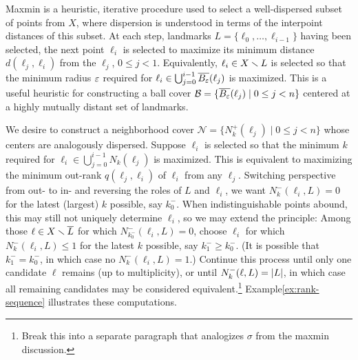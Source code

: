 \documentclass[
]{article}
\begin{document}
Maxmin is a heuristic, iterative procedure used to select a
well-dispersed subset of points from \(X\), where dispersion is
understood in terms of the interpoint distances of this subset. At each
step, landmarks \(L = \{\ell_0, \ldots, \ell_{i-1}\}\) having been
selected, the next point \(\ell_i\) is selected to maximize its minimum
distance \(d(\ell_j,\ell_i)\) from the \(\ell_j\), \(0 \leq j < 1\).
Equivalently, \(\ell_i \in X \smallsetminus L\) is selected so that the minimum
radius \(\varepsilon\) required for
\(\ell_i \in \bigcup_{j=0}^{i-1}{\overline{B_\varepsilon}(\ell_j)}\) is maximized.
This is a useful heuristic for constructing a ball cover
\(\mathcal{B} = \{\overline{B_\varepsilon}(\ell_j) \mid 0 \leq j < n\}\) centered at
a highly mutually distant set of landmarks.

We desire to construct a neighborhood cover
\(\mathcal{N} = \{N^+_k(\ell_j) \mid 0 \leq j < n\}\) whose centers are
analogously dispersed. Suppose \(\ell_i\) is selected so that the
minimum \(k\) required for
\(\ell_i \in \bigcup_{j=0}^{i-1}{N_k(\ell_j)}\) is maximized. This is
equivalent to maximizing the minimum out-rank \(q(\ell_j,\ell_i)\) of
\(\ell_i\) from any \(\ell_j\). Switching perspective from out- to in-
and reversing the roles of \(L\) and \(\ell_i\), we want
\(N^-_k(\ell_i,L)=0\) for the latest (largest) \(k\) possible, say
\(k^-_0\). When indistinguishable points abound, this may still not
uniquely determine \(\ell_i\), so we may extend the principle: Among
those \(\ell\in X\smallsetminus \overline{L}\) for which \(N^-_{k^-_0}(\ell_i,L)=0\),
choose \(\ell_i\) for which \(N^-_{k}(\ell_i,L) \leq 1\) for the latest
\(k\) possible, say \(k^-_1 \geq k^-_0\). (It is possible that
\(k^-_1 = k^-_0\), in which case no \(N^-_k(\ell_i,L) = 1\).) Continue
this process until only one candidate \(\ell\) remains (up to
multiplicity), or until \(N^-_{k}(\ell,L)=\lvert L\rvert\), in which case all
remaining candidates may be considered equivalent.\footnote{Break this
  into a separate paragraph that analogizes \(\sigma\) from the maxmin
  discussion.} Example\nbs\ref{ex:rank-sequence} illustrates these
computations.
\end{document}
